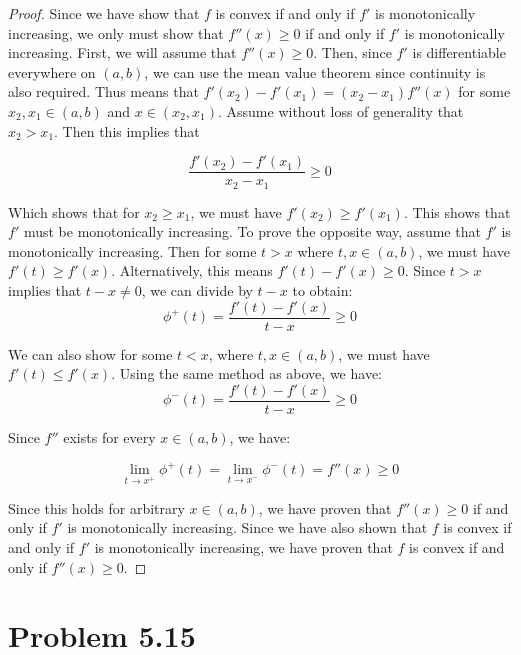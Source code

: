 \documentclass[psamsfonts]{amsart}
\theoremstyle{definition}
\theoremstyle{remark}
\numberwithin{equation}{section}
\begin{document}
\begin{proof}
Since we have show that $f$ is convex if and only if $f'$ is monotonically increasing, we only must show that $f''(x) \geq 0$ if and only if $f'$ is monotonically increasing. First, we will assume that $f''(x) \geq 0$. Then, since $f'$ is differentiable everywhere on $(a,b)$, we can use the mean value theorem since continuity is also required. Thus means that $f'(x_2) - f'(x_1) = (x_2 - x_1) f''(x)$ for some $x_2, x_1 \in (a,b)$ and $x \in (x_2, x_1)$. Assume without loss of generality that $x_2 > x_1$. Then this implies that 

\begin{equation}
\frac{f'(x_2) - f'(x_1)}{x_2 - x_1} \geq 0
\end{equation}

Which shows that for $x_2 \geq x_1$, we must have $f'(x_2) \geq f'(x_1)$. This shows that $f'$ must be monotonically increasing. To prove the opposite way, assume that $f'$ is monotonically increasing. Then for some $t > x$ where $t, x \in (a,b)$, we must have $f'(t) \geq f'(x)$. Alternatively, this means $f'(t) - f'(x) \geq 0$. Since $t > x$ implies that $t-x \neq 0$, we can divide by $t-x$ to obtain:
\begin{equation}
\phi^{+}(t) = \frac{f'(t) - f'(x)}{t-x} \geq 0 
\end{equation}

We can also show for some $t < x$, where $t,x \in (a,b)$, we must have $f'(t) \leq f'(x)$. Using the same method as above, we have:
\begin{equation}
\phi^{-}(t) = \frac{f'(t) - f'(x)}{t-x} \geq 0
\end{equation}

Since $f''$ exists for every $x \in (a,b)$, we have:

\begin{equation}
\lim_{t \to x^{+}} \phi^{+}(t) = \lim_{t \to x^{-}} \phi^{-}(t) = f''(x) \geq 0
\end{equation}

Since this holds for arbitrary $x \in (a,b)$, we have proven that $f''(x) \geq 0$ if and only if $f'$ is monotonically increasing. Since we have also shown that $f$ is convex if and only if $f'$ is monotonically increasing, we have proven that $f$ is convex if and only if $f''(x) \geq 0$. 
\end{proof}

\section{Problem 5.15}
\end{document}
